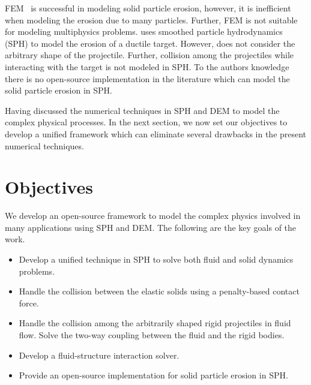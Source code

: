 FEM~\parencite{takaffoli2009finite} is successful in modeling solid particle
erosion, however, it is inefficient when modeling the erosion due to many
particles. Further, FEM is not suitable for modeling multiphysics problems.
\textcite{dong2016smoothed} uses smoothed particle hydrodynamics (SPH) to model the
erosion of a ductile target. However, \textcite{dong2016smoothed} does not consider
the arbitrary shape of the projectile. Further, collision among the projectiles
while interacting with the target is not modeled in SPH. To the authors
knowledge there is no open-source implementation in the literature which can
model the solid particle erosion in SPH.

Having discussed the numerical techniques in SPH and DEM to model the complex
physical processes. In the next section, we now set our objectives to develop a
unified framework which can eliminate several drawbacks in the present numerical
techniques.

\section{Objectives}
We develop an open-source framework to model the complex physics involved in
many applications using SPH and DEM. The following are the key goals of the work.
\begin{itemize}
\item Develop a unified technique in SPH to solve both fluid and solid dynamics
  problems.
\item Handle the collision between the elastic solids using a penalty-based contact force.
\item Handle the collision among the arbitrarily shaped rigid projectiles in fluid
  flow. Solve the two-way coupling between the fluid and the rigid bodies.
\item Develop a fluid-structure interaction solver.
\item Provide an open-source implementation for solid particle erosion in SPH.
\end{itemize}

